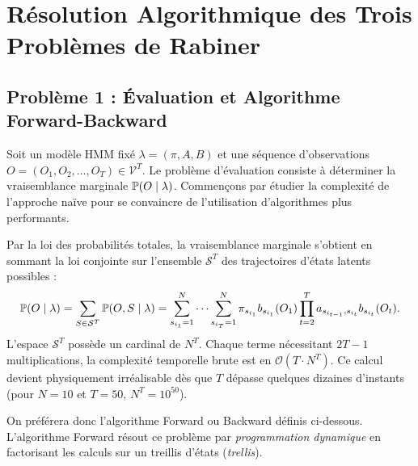 \section{Résolution Algorithmique des Trois Problèmes de Rabiner}

\subsection{Problème 1 : Évaluation et Algorithme Forward-Backward}

Soit un modèle HMM fixé $\lambda = (\pi, A, B)$ et une séquence d'observations $O = (O_1, O_2, \dots, O_T) \in \mathcal{V}^T$. Le problème d'évaluation consiste à déterminer la vraisemblance marginale $\mathbb{P}(O \mid \lambda)$. Commençons par étudier la complexité de l'approche naïve pour se convaincre de l'utilisation d'algorithmes plus performants. 

\begin{proposition}
    Par la loi des probabilités totales, la vraisemblance marginale s'obtient en sommant la loi conjointe sur l'ensemble $\mathcal{S}^T$ des trajectoires d'états latents possibles :
    \begin{equation}
        \mathbb{P}(O \mid \lambda) = \sum_{S \in \mathcal{S}^T} \mathbb{P}(O, S \mid \lambda) = \sum_{s_{i_1}=1}^N \dots \sum_{s_{i_T}=1}^N \pi_{s_{i_1}} b_{s_{i_1}}(O_1) \prod_{t=2}^T a_{s_{i_{t-1}}, s_{i_t}} b_{s_{i_t}}(O_t).
    \end{equation}
    L'espace $\mathcal{S}^T$ possède un cardinal de $N^T$. Chaque terme nécessitant $2T-1$ multiplications, la complexité temporelle brute est en $\mathcal{O}(T \cdot N^T)$. Ce calcul devient physiquement irréalisable dès que $T$ dépasse quelques dizaines d'instants (pour $N=10$ et $T=50$, $N^T = 10^{50}$).    
\end{proposition}

On préférera donc l'algorithme Forward ou Backward définis ci-dessous. L'algorithme Forward résout ce problème par \emph{programmation dynamique} en factorisant les calculs sur un treillis d'états (\emph{trellis}).

